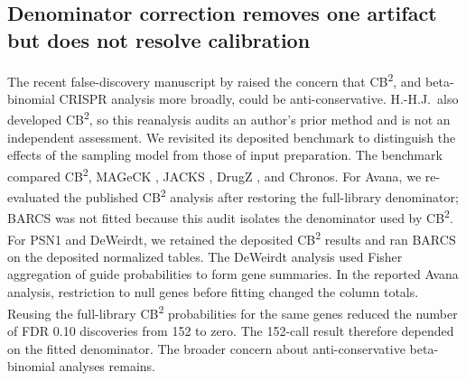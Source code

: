 \subsection{Denominator correction removes one artifact but does not resolve
calibration}
\label{sec:supp-fdr-audit}

The recent false-discovery manuscript by \citet{dempster2025fdr} raised the
concern that CB\textsuperscript{2}, and beta-binomial CRISPR analysis more
broadly, could be anti-conservative.  H.-H.J.\ also developed
CB\textsuperscript{2}, so this reanalysis audits an author's prior method and
is not an independent assessment.  We revisited its deposited benchmark
\citep{dempster2025fdrdata} to distinguish the effects of the sampling model
from those of input preparation.  The benchmark compared
CB\textsuperscript{2}, MAGeCK \citep{li2014mageck}, JACKS
\citep{allen2019jacks}, DrugZ \citep{colic2019drugz}, and Chronos.  For Avana,
we re-evaluated the published CB\textsuperscript{2} analysis
\citep{jeong2019beta} after restoring the full-library denominator; BARCS was
not fitted because this audit isolates the denominator used by
CB\textsuperscript{2}.  For PSN1 and DeWeirdt, we retained the deposited
CB\textsuperscript{2} results and ran BARCS on the deposited normalized
tables.  The DeWeirdt analysis used Fisher aggregation of guide probabilities
to form gene summaries.  In the reported Avana analysis, restriction to null
genes before fitting changed the column totals.  Reusing the full-library
CB\textsuperscript{2} probabilities for the same genes reduced the number of
FDR 0.10 discoveries from 152 to zero.  The 152-call result therefore depended
on the fitted denominator.  The broader concern about anti-conservative
beta-binomial analyses remains.

